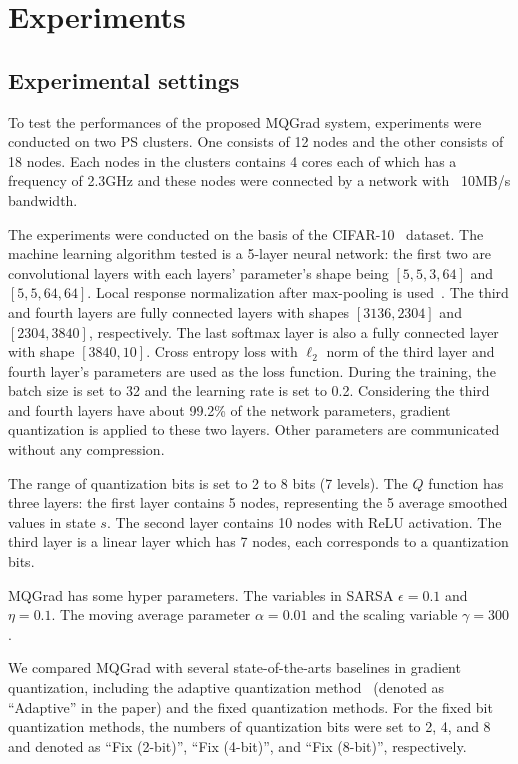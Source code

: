 \documentclass[sigconf]{acmart}
\begin{document}
\section{Experiments}
\subsection{Experimental settings}
To test the performances of the proposed MQGrad system, experiments were conducted on two PS clusters. One consists of 12 nodes and the other consists of 18 nodes. Each nodes in the clusters contains 4 cores each of which has a frequency of 2.3GHz and these nodes were connected by a network with ~10MB/s bandwidth.

The experiments were conducted on the basis of the CIFAR-10~\cite{krizhevsky2009learning} dataset. The machine learning algorithm tested is a 5-layer neural network: the first two are convolutional layers with each layers' parameter's shape being $[5,5,3,64]$ and $[5,5,64,64]$. Local response normalization after max-pooling is used~\cite{krizhevsky2012imagenet}. The third and fourth layers are fully connected layers with shapes $[3136, 2304]$ and $[2304, 3840]$, respectively. The last softmax layer is also a fully connected layer with shape $[3840, 10]$. Cross entropy loss with  $\ell_2$ norm of the third layer and fourth layer's parameters are used as the loss function. During the training, the batch size is set to 32 and the learning rate is set to 0.2. Considering the third and fourth layers have about 99.2\% of the network parameters, gradient quantization is applied to these two layers. Other parameters are communicated without any compression.

The range of quantization bits is set to 2 to 8 bits (7 levels). The $Q$ function has three layers: the first layer contains 5 nodes, representing the 5 average smoothed values in state $s$. The second layer contains 10 nodes with ReLU activation. The third layer is a linear layer which has 7 nodes, each corresponds to a quantization bits. %

MQGrad has some hyper parameters. The variables in SARSA $\epsilon =0.1$ and $\eta = 0.1$. The moving average parameter $\alpha = 0.01$ and the scaling variable $\gamma=300$.

We compared MQGrad with several state-of-the-arts baselines in gradient quantization, including the adaptive quantization method~\cite{oland2015reducing} (denoted as ``Adaptive'' in the paper) and the fixed quantization methods. For the fixed bit quantization methods, the numbers of quantization bits were set to 2, 4, and 8 and denoted as ``Fix (2-bit)'', ``Fix (4-bit)'', and ``Fix (8-bit)'', respectively.%
\end{document}
